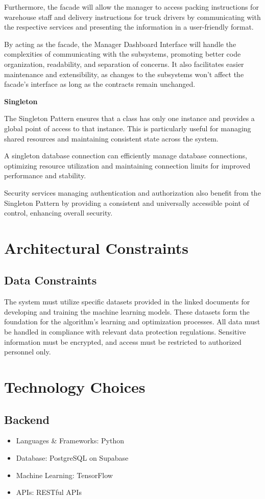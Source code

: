 \documentclass{article}
\begin{document}
Furthermore, the facade will allow the manager to access packing instructions for
warehouse staff and delivery instructions for truck drivers by communicating with the
respective services and presenting the information in a user-friendly format.

By acting as the facade, the Manager Dashboard Interface will handle the complexities
of communicating with the subsystems, promoting better code organization, readability,
and separation of concerns. It also facilitates easier maintenance and extensibility, as
changes to the subsystems won't affect the facade's interface as long as the contracts
remain unchanged.

\textbf{Singleton}

The Singleton Pattern ensures that a class has only one instance and provides a global
point of access to that instance. This is particularly useful for managing shared
resources and maintaining consistent state across the system.

A singleton database connection can efficiently manage database connections,
optimizing resource utilization and maintaining connection limits for improved
performance and stability.

Security services managing authentication and authorization also benefit from the
Singleton Pattern by providing a consistent and universally accessible point of control,
enhancing overall security.

\section{Architectural Constraints}
\subsection{Data Constraints}
The system must utilize specific datasets provided in the linked documents for
developing and training the machine learning models. These datasets form the
foundation for the algorithm's learning and optimization processes. All data must be
handled in compliance with relevant data protection regulations. Sensitive information
must be encrypted, and access must be restricted to authorized personnel only.

\section{Technology Choices}
\subsection{Backend}
\begin{itemize}
    \item Languages \& Frameworks: Python
    \item Database: PostgreSQL on Supabase
    \item Machine Learning: TensorFlow
    \item APIs: RESTful APIs
\end{itemize}
\end{document}
